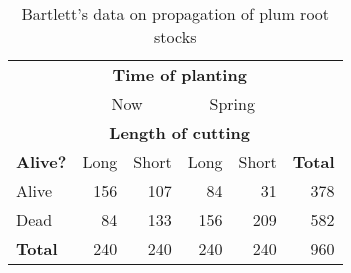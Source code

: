 \begin{table}[htb]
 \caption{Bartlett's data on propagation of plum root stocks}
 \label{tab:bartlett}
 \begin{center}
  \begin{tabular}{|l|rrrr|r|}
   \hline
 & \multicolumn{4}{c|}{\bfseries\large Time of planting} & \rule{0in}{2.5ex}\\
 & \multicolumn{2}{c|}{Now   } & \multicolumn{2}{c|}{Spring} &  \\\cline{2-5}
 & \multicolumn{4}{c|}{\bfseries\large Length of cutting} & \rule{0in}{2.5ex}\\
{\bfseries\large Alive?} & Long   & Short  & Long   & Short & {\bfseries\large Total} \\
   \hline
Alive    &      156 &      107 &       84 &       31 &      378 \\
Dead     &       84 &      133 &      156 &      209 &      582 \\
   \hline
\rule{0in}{2.5ex}{\bfseries\large Total} &     240 &      240 &      240 &      240 &      960 \\
   \hline
  \end{tabular}
 \end{center}
\end{table}
